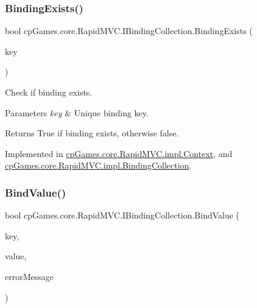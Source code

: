 \subsubsection{\texorpdfstring{BindingExists()}{BindingExists()}}
{\footnotesize\ttfamily bool cp\+Games.\+core.\+Rapid\+M\+V\+C.\+I\+Binding\+Collection.\+Binding\+Exists (\begin{DoxyParamCaption}\item[{\mbox{\hyperlink{interfacecp_games_1_1core_1_1_rapid_m_v_c_1_1_i_binding_key}{I\+Binding\+Key}}}]{key }\end{DoxyParamCaption})}



Check if binding exists. 


\begin{DoxyParams}{Parameters}
{\em key} & Unique binding key.\\
\hline
\end{DoxyParams}
\begin{DoxyReturn}{Returns}
True if binding exists, otherwise false.
\end{DoxyReturn}


Implemented in \mbox{\hyperlink{classcp_games_1_1core_1_1_rapid_m_v_c_1_1impl_1_1_context_a57ed228fbab80263bf2197dd27eadbbd}{cp\+Games.\+core.\+Rapid\+M\+V\+C.\+impl.\+Context}}, and \mbox{\hyperlink{classcp_games_1_1core_1_1_rapid_m_v_c_1_1impl_1_1_binding_collection_a0ea0895570b8a80afacfe4786df4954b}{cp\+Games.\+core.\+Rapid\+M\+V\+C.\+impl.\+Binding\+Collection}}.

\mbox{\label{interfacecp_games_1_1core_1_1_rapid_m_v_c_1_1_i_binding_collection_a2a468c5570b780133763d9592e2c1cb5}} 
\subsubsection{\texorpdfstring{BindValue()}{BindValue()}}
{\footnotesize\ttfamily bool cp\+Games.\+core.\+Rapid\+M\+V\+C.\+I\+Binding\+Collection.\+Bind\+Value (\begin{DoxyParamCaption}\item[{\mbox{\hyperlink{interfacecp_games_1_1core_1_1_rapid_m_v_c_1_1_i_binding_key}{I\+Binding\+Key}}}]{key,  }\item[{object}]{value,  }\item[{out string}]{error\+Message }\end{DoxyParamCaption})}



